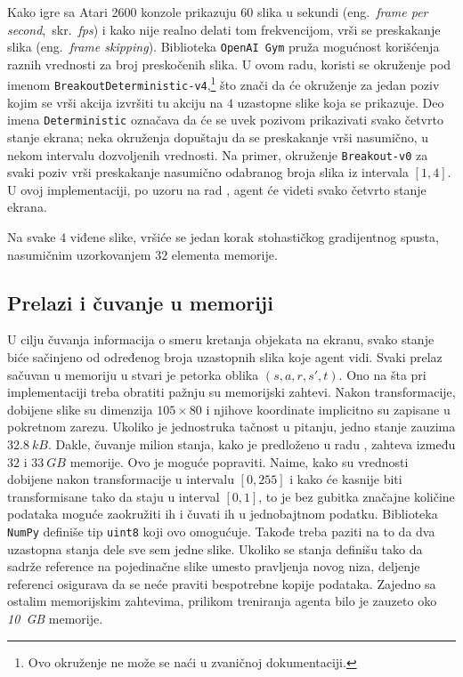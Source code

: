\par 
Kako igre sa Atari 2600 konzole prikazuju $60$ slika u sekundi (eng.~{\em frame per second},~skr.~{\em fps}) i kako nije realno delati tom frekvencijom, vrši se preskakanje slika (eng.~{\em frame skipping}). Biblioteka \texttt{OpenAI Gym} pruža mogućnost korišćenja raznih vrednosti za broj preskočenih slika. U ovom radu, koristi se okruženje pod imenom \texttt{BreakoutDeterministic-v4},\footnote{Ovo okruženje ne može se naći u zvaničnoj dokumentaciji.} što znači da će okruženje za jedan poziv kojim se vrši akcija izvršiti tu akciju na $4$ uzastopne slike koja se prikazuje. Deo imena \texttt{Deterministic} označava da će se uvek pozivom prikazivati svako četvrto stanje ekrana; neka okruženja dopuštaju da se preskakanje vrši nasumično, u nekom intervalu dozvoljenih vrednosti. Na primer, okruženje \texttt{Breakout-v0} za svaki poziv vrši preskakanje nasumično odabranog broja slika iz intervala $[1,4]$. U ovoj implementaciji, po uzoru na rad \cite{dqn_dm}, agent će videti svako četvrto stanje ekrana. 
\par 
Na svake $4$ viđene slike, vršiće se jedan korak stohastičkog gradijentnog spusta, nasumičnim uzorkovanjem $32$ elementa memorije.

\subsection{Prelazi i čuvanje u memoriji}

U cilju čuvanja informacija o smeru kretanja objekata na ekranu, svako stanje biće sačinjeno od određenog broja uzastopnih slika koje agent vidi. Svaki prelaz sačuvan u memoriju u stvari je petorka oblika $(s, a, r, s', t)$. 
Ono na šta pri implementaciji treba obratiti pažnju su memorijski zahtevi. Nakon transformacije, dobijene slike su dimenzija $105 \times 80$ i njihove koordinate implicitno su zapisane u pokretnom zarezu. Ukoliko je jednostruka tačnost u pitanju, jedno stanje zauzima $32.8~kB$. Dakle, čuvanje milion stanja, kako je predloženo u radu \cite{dqn_dm}, zahteva između $32$ i $33~GB$ memorije. Ovo je moguće popraviti. Naime, kako su vrednosti dobijene nakon transformacije u intervalu $[0, 255]$ i kako će kasnije biti transformisane tako da staju u interval $[0, 1]$, to je bez gubitka značajne količine podataka moguće zaokružiti ih i čuvati ih u jednobajtnom podatku. Biblioteka \texttt{NumPy} definiše tip \texttt{uint8} koji ovo omogućuje. Takođe treba paziti na to da dva uzastopna stanja dele sve sem jedne slike. Ukoliko se stanja definišu tako da sadrže reference na pojedinačne slike umesto pravljenja novog niza, deljenje referenci osigurava da se neće praviti bespotrebne kopije podataka. Zajedno sa ostalim memorijskim zahtevima, prilikom treniranja agenta bilo je zauzeto oko {\em 10~GB} memorije.

